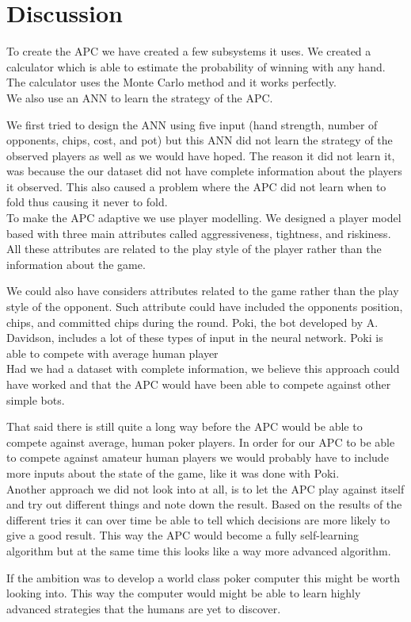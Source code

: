 \section{Discussion}
To create the APC we have created a few subsystems it uses. We created a calculator which is able to estimate the probability of winning with any hand. The calculator uses the Monte Carlo method and it works perfectly.\\

We also use an ANN to learn the strategy of the APC. 

We first tried to design the ANN using five input (hand strength, number of opponents, chips, cost, and pot) but this ANN did not learn the strategy of the observed players as well as we would have hoped. The reason it did not learn it, was because the our dataset did not have complete information about the players it observed. This also caused a problem where the APC did not learn when to fold thus causing it never to fold.\\

To make the APC adaptive we use player modelling. We designed a player model based with three main attributes called aggressiveness, tightness, and riskiness. All these attributes are related to the play style of the player rather than the information about the game.  

We could also have considers attributes related to the game rather than the play style of the opponent. Such attribute could have included the opponents position, chips, and committed chips during the round. Poki, the bot developed by A. Davidson, includes a lot of these types of input in the neural network. Poki is able to compete with average human player\\

Had we had a dataset with complete information, we believe this approach could have worked and that the APC would have been able to compete against other simple bots.

That said there is still quite a long way before the APC would be able to compete against average, human poker players. In order for our APC to be able to compete against amateur human players we would probably have to include more inputs about the state of the game, like it was done with Poki.\\

Another approach we did not look into at all, is to let the APC play against itself and try out different things and note down the result. Based on the results of the different tries it can over time be able to tell which decisions are more likely to give a good result. This way the APC would become a fully self-learning algorithm but at the same time this looks like a way more advanced algorithm. 

If the ambition was to develop a world class poker computer this might be worth looking into. This way the computer would might be able to learn highly advanced strategies that the humans are yet to discover.